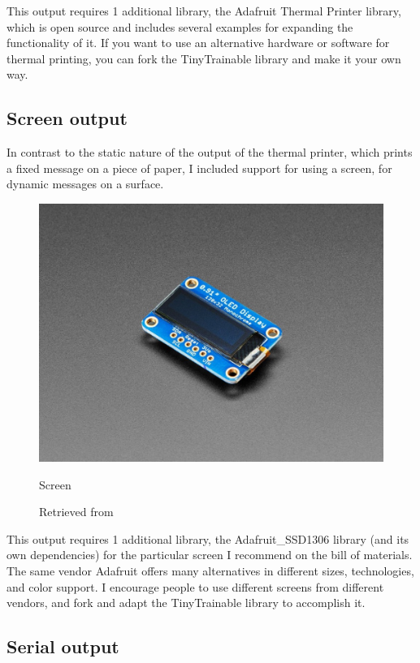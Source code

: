 This output requires 1 additional library, the Adafruit Thermal Printer library, which is open source and includes several examples for expanding the functionality of it. If you want to use an alternative hardware or software for thermal printing, you can fork the TinyTrainable library and make it your own way.

\subsection{Screen output}

In contrast to the static nature of the output of the thermal printer, which prints a fixed message on a piece of paper, I included support for using a screen, for dynamic messages on a surface. 

\begin{figure}[ht]
  \centering
  \includegraphics[width=0.75\linewidth,height=0.25\textheight,keepaspectratio]{images/materials-adafruit-screen.jpg}
  \caption{Screen}
  \caption*{Retrieved from \cite{website-materials-adafruit-screen}}
  \label{fig:materials-adafruit-screen}
\end{figure}

This output requires 1 additional library, the Adafruit{\_}SSD1306 library (and its own dependencies) for the particular screen I recommend on the bill of materials. The same vendor Adafruit offers many alternatives in different sizes, technologies, and color support. I encourage people to use different screens from different vendors, and fork and adapt the TinyTrainable library to accomplish it.

\subsection{Serial output}

